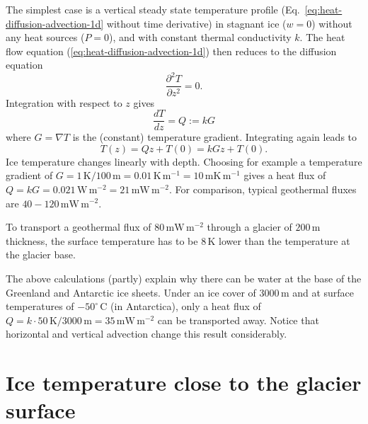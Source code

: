 \documentclass[11pt,a4paper,halfparskip]{scrartcl}
\newcommand{\unit}[1]{\ensuremath{\,\mathrm{#1}}}
\newcommand{\cels}[1]{\ensuremath{#1^{\circ}\,\mathrm{C}}}
\begin{document}
The simplest case is a vertical steady state temperature profile
(Eq.~\ref{eq:heat-diffusion-advection-1d} without time derivative) in stagnant
ice ($w=0$) without any heat sources ($P=0$), and with constant thermal
conductivity $k$.  The heat flow equation
(\ref{eq:heat-diffusion-advection-1d}) then reduces to the diffusion equation
%
\begin{equation}
 \label{eq:diffusion-1d}
 \frac{\partial^2T}{\partial z^2} = 0.
\end{equation}
%
Integration with respect to $z$ gives
%
\begin{equation}
 \label{eq:diffusion-1d-1int}
 \frac{dT}{d z} = Q := k G
\end{equation}
%
where $G = \nabla T$ is the (constant) temperature gradient. Integrating again
leads to
%
\begin{equation}
 \label{eq:diffusion-1d-2int}
 T(z) = Q z + T(0) = kGz + T(0).
\end{equation}
%
Ice temperature changes linearly with depth.  Choosing for example a
temperature gradient of $G=1\unit{K}/ 100\unit{m} = 0.01\unit{K}\unit{m}^{-1}
= 10 \unit{mK}\unit{m}^{-1}$ gives a heat flux of $Q = kG = 0.021\unit{W}
\unit{m}^{-2} = 21\unit{mW} \unit{m}^{-2}$.  For comparison, typical
geothermal fluxes are $40- 120 \unit{mW} \unit{m}^{-2}$.

To transport a geothermal flux of $80 \unit{mW} \unit{m}^{-2}$ through a
glacier of $200\unit{m}$ thickness, the surface temperature has to be
$8\unit{K}$ lower than the temperature at the glacier base.

The above calculations (partly) explain why there can be water at the base of
the Greenland and Antarctic ice sheets.  Under an ice cover of $3000\unit{m}$
and at surface temperatures of \cels{-50} (in Antarctica), only a heat flux of
$Q=k \cdot 50\unit{K}/3000\unit{m}= 35\unit{mW}\unit{m}^{-2}$ can be
transported away.  Notice that horizontal and vertical advection change this
result considerably.


\section{Ice temperature close to the glacier surface}
\label{sec:ice-temp-surface}
\end{document}

